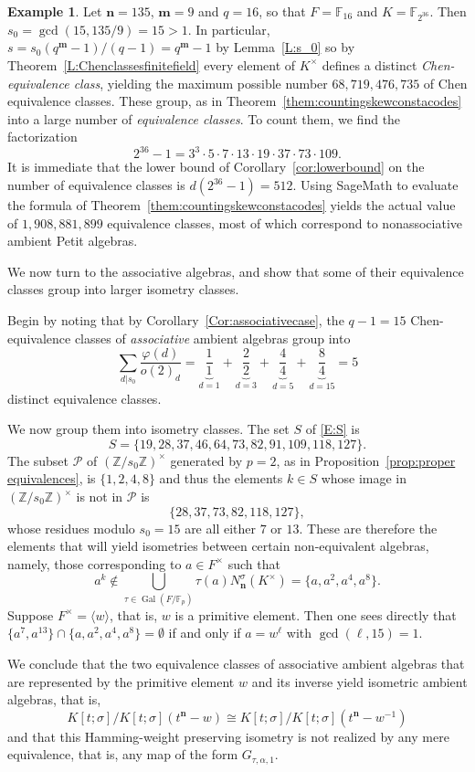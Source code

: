 \documentclass[11pt]{amsart}
\theoremstyle{plain}
\theoremstyle{definition}
\newtheorem{example}[theorem]{Example}
\numberwithin{equation}{section}
\numberwithin{figure}{section}
\newcommand{\ZZ}{\mathbb{Z}}
\newcommand{\FF}{\mathbb{F}}
\newcommand{\Kone}[1]{K[t;\sigma]/K[t;\sigma](t^{\de}-#1)}
\newcommand{\os}{{\mathbf{m}}}  %
\newcommand{\de}{{\mathbf{n}}}  %
\DeclareMathOperator{\Gal}{Gal}
\begin{document}
\begin{example}\label{Eg:m=135n=9q=16}
    Let $\de=135$, $\os=9$ and $q=16$, so that $F=\FF_{16}$ and $K=\FF_{2^{36}}$.  Then  $s_0=\gcd(15,135/9)=15>1$.  In particular, $s=s_0(q^\os-1)/(q-1)=q^\os-1$ by Lemma~\ref{L:s_0} so by Theorem~\ref{L:Chenclassesfinitefield} every element of $K^\times$ defines a distinct \emph{Chen-equivalence class}, yielding the maximum possible number $68,719,476,735$ of Chen equivalence classes.
These group, as in Theorem~\ref{them:countingskewconstacodes} into a large number of \emph{equivalence classes}.  To count them, we find the  factorization
$$2^{36}-1
=3^3\cdot5
\cdot7\cdot13
\cdot19\cdot37\cdot73\cdot109.$$
It is immediate that the lower bound of Corollary~\ref{cor:lowerbound} on the number of equivalence classes is $d(2^{36}-1)=512$.  Using SageMath \cite{sagemath} to evaluate the formula of Theorem~\ref{them:countingskewconstacodes} yields the actual value of $1,908,881,899$ equivalence classes,   most of which correspond to nonassociative ambient Petit algebras.

We now turn to the associative algebras, and show that some of their equivalence classes group into larger isometry classes.

Begin by noting that by Corollary~\ref{Cor:associativecase}, the  $q-1=15$ Chen-equivalence classes of \emph{associative} ambient algebras  group into
$$
\sum_{d|s_0} \frac{\varphi(d)}{o(2)_d} = \underbrace{\frac{1}{1}}_{d=1}+\underbrace{\frac{2}{2}}_{d=3}+\underbrace{\frac{4}{4}}_{d=5}+
    \underbrace{\frac{8}{4}}_{d=15}=5
    $$
distinct equivalence classes.

We now group them into isometry classes.
    The set $S$ of \eqref{E:S} is
    $$S=\{19, 28, 37, 46, 64, 73, 82, 91, 109, 118, 127\}.$$
The subset $\mathscr{P}$ of $(\ZZ/s_0\ZZ)^\times$ generated by $p=2$, as in Proposition~\ref{prop:proper equivalences}, is
$
\{1, 2, 4, 8\}$
and thus the elements $k\in S$ whose image in $(\ZZ/s_0\ZZ)^\times$ is not in $\mathscr{P}$ is
$$
\{28, 37, 73, 82, 118, 127\},
$$
whose residues modulo $s_0=15$ are all either $7$ or $13$.
These are therefore the elements that will yield isometries between certain non-equivalent algebras, namely, those corresponding to $a\in F^\times$ such that
$$
a^k \notin \bigcup_{\tau\in \Gal(F/\FF_p)}\tau(a)N_\de^\sigma(K^\times) = \{a, a^2, a^4, a^8\}.
$$
Suppose $F^\times = \langle w \rangle$, that is, $w$ is a primitive element.   Then one  sees directly that $\{a^7, a^{13}\}\cap \{a,a^2,a^4,a^8\}=\emptyset$ if and only if $a=w^\ell$ with $\gcd(\ell,15)=1$.

We conclude that the two equivalence classes of associative ambient algebras that are represented by the primitive element $w$ and its inverse yield isometric ambient algebras, that is,
$$
\Kone{w}\cong \Kone{w^{-1}}
$$
and that this Hamming-weight preserving isometry is not realized by any mere equivalence, that is, any map of the form $G_{\tau,\alpha,1}$.
\end{example}
\end{document}
